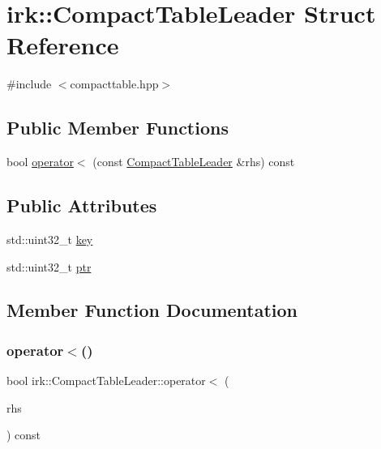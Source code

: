 \hypertarget{structirk_1_1CompactTableLeader}{}\section{irk\+:\+:Compact\+Table\+Leader Struct Reference}
\label{structirk_1_1CompactTableLeader}


{\ttfamily \#include $<$compacttable.\+hpp$>$}

\subsection*{Public Member Functions}
\begin{DoxyCompactItemize}
\item 
bool \mbox{\hyperlink{structirk_1_1CompactTableLeader_a772abae07f1736c90426d7260ef986fb}{operator$<$}} (const \mbox{\hyperlink{structirk_1_1CompactTableLeader}{Compact\+Table\+Leader}} \&rhs) const
\end{DoxyCompactItemize}
\subsection*{Public Attributes}
\begin{DoxyCompactItemize}
\item 
std\+::uint32\+\_\+t \mbox{\hyperlink{structirk_1_1CompactTableLeader_a6f10d4fa31ada93273d6eb0ffd340d83}{key}}
\item 
std\+::uint32\+\_\+t \mbox{\hyperlink{structirk_1_1CompactTableLeader_ad0809dc1fada76cebf3b69629475da60}{ptr}}
\end{DoxyCompactItemize}


\subsection{Member Function Documentation}
\mbox{\label{structirk_1_1CompactTableLeader_a772abae07f1736c90426d7260ef986fb}} 
\subsubsection{\texorpdfstring{operator$<$()}{operator<()}}
{\footnotesize\ttfamily bool irk\+::\+Compact\+Table\+Leader\+::operator$<$ (\begin{DoxyParamCaption}\item[{const \mbox{\hyperlink{structirk_1_1CompactTableLeader}{Compact\+Table\+Leader}} \&}]{rhs }\end{DoxyParamCaption}) const\hspace{0.3cm}{\ttfamily [inline]}}



